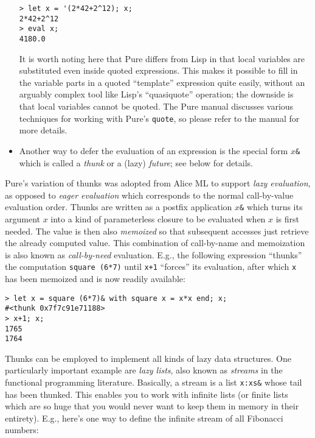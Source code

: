 \documentclass[a4paper,12pt]{article}
\begin{document}
\begin{itemize}
\begin{lstlisting}
> let x = '(2*42+2^12); x;
2*42+2^12
> eval x;
4180.0
\end{lstlisting}

It is worth noting here that Pure differs from Lisp in that local variables are substituted even inside quoted expressions. This makes it possible to fill in the variable parts in a quoted ``template'' expression quite easily, without an arguably complex tool like Lisp's ``quasiquote'' operation; the downside is that local variables cannot be quoted. The Pure manual discusses various techniques for working with Pure's \lstinline|quote|, so please refer to the manual for more details.
\item Another way to defer the evaluation of an expression is the special form $x$\verb|&| which is called a \emph{thunk} or a (lazy) \emph{future}; see below for details.
\end{itemize}

Pure's variation of thunks was adopted from Alice ML \cite{Alice} to support \emph{lazy evaluation}, as opposed to \emph{eager evaluation} which corresponds to the normal call-by-value evaluation order. Thunks are written as a postfix application $x$\verb|&| which turns its argument $x$ into a kind of parameterless closure to be evaluated when $x$ is first needed. The value is then also \emph{memoized} so that subsequent accesses just retrieve the already computed value. This combination of call-by-name and memoization is also known as \emph{call-by-need} evaluation. E.g., the following expression ``thunks'' the computation \verb|square (6*7)| until \verb|x+1| ``forces'' its evaluation, after which \verb|x| has been memoized and is now readily available:

\begin{lstlisting}
> let x = square (6*7)& with square x = x*x end; x;
#<thunk 0x7f7c91e71188>
> x+1; x;
1765
1764
\end{lstlisting}

Thunks can be employed to implement all kinds of lazy data structures. One particularly important example are \emph{lazy lists}, also known as \emph{streams} in the functional programming literature. Basically, a stream is a list \verb|x:xs&| whose tail has been thunked. This enables you to work with infinite lists (or finite lists which are so huge that you would never want to keep them in memory in their entirety). E.g., here’s one way to define the infinite stream of all Fibonacci numbers:
\end{document}

